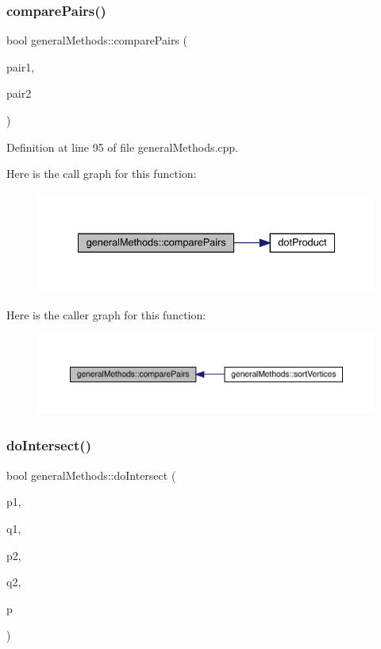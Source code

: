 \subsubsection{\texorpdfstring{compare\+Pairs()}{comparePairs()}}
{\footnotesize\ttfamily bool general\+Methods\+::compare\+Pairs (\begin{DoxyParamCaption}\item[{vertex\+Edge\+Pair}]{pair1,  }\item[{vertex\+Edge\+Pair}]{pair2 }\end{DoxyParamCaption})}



Definition at line 95 of file general\+Methods.\+cpp.

Here is the call graph for this function\+:
\nopagebreak
\begin{figure}[H]
\begin{center}
\leavevmode
\includegraphics[width=335pt]{namespacegeneral_methods_afc8f20af710f8dc24af591015acc1403_cgraph}
\end{center}
\end{figure}
Here is the caller graph for this function\+:
\nopagebreak
\begin{figure}[H]
\begin{center}
\leavevmode
\includegraphics[width=350pt]{namespacegeneral_methods_afc8f20af710f8dc24af591015acc1403_icgraph}
\end{center}
\end{figure}
\mbox{\label{namespacegeneral_methods_a56efd049c58aae30a7b0caf39beab615}} 
\subsubsection{\texorpdfstring{do\+Intersect()}{doIntersect()}}
{\footnotesize\ttfamily bool general\+Methods\+::do\+Intersect (\begin{DoxyParamCaption}\item[{vertex3D}]{p1,  }\item[{vertex3D}]{q1,  }\item[{vertex3D}]{p2,  }\item[{vertex3D}]{q2,  }\item[{plane}]{p }\end{DoxyParamCaption})}



